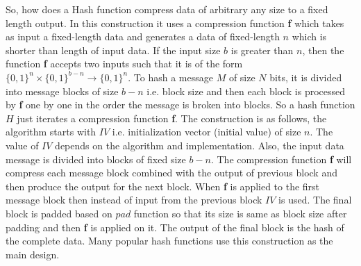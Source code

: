 So, how does a Hash function compress data of arbitrary any size to a fixed length output. In this construction it uses a compression function \textbf{f} which takes as input a fixed-length data and generates a data of fixed-length $n$ which is shorter than length of input data. If the input size $b$ is greater than $n$, then the function \textbf{f} accepts two inputs such that it is of the form $\big\{0,1\big\}^n \times \big\{0,1\big\}^{b - n} \rightarrow \big\{0,1\big\}^n$. To hash a message $M$ of size $N$ bits, it is divided into message blocks of size $b-n$ i.e. block size and then each block is processed by \textbf{f} one by one in the order the message is broken into blocks. So a hash function $H$ just iterates a compression function \textbf{f}. The construction is as follows, the algorithm starts with $IV$ i.e. initialization vector (initial value) of size $n$. The value of $IV$ depends on the algorithm and implementation. Also, the input data message is divided into blocks of fixed size $b-n$.
The compression function \textbf{f} will compress each message block combined with the output of previous block and then produce the output for the next block. When \textbf{f} is applied to the first message block then instead of input from the previous block $IV$ is used. The final block is padded based on $pad$ function so that its size is same as block size after padding and then \textbf{f} is applied on it. The output of the final block is the hash of the complete data. Many popular hash functions use this construction as the main design. 

